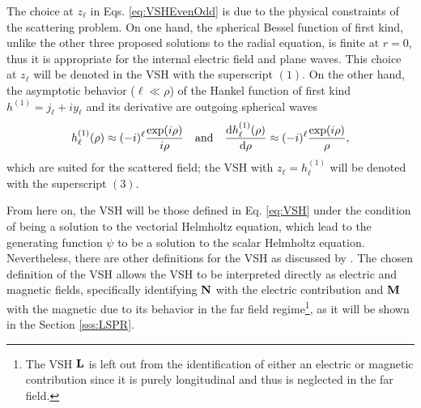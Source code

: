 \noindent%
The choice at $z_\ell$ in Eqs. \eqref{eq:VSHEvenOdd} is due to the physical constraints of the scattering problem. On one hand, the spherical Bessel function of first kind, unlike the other three proposed solutions to the radial equation, is finite at $r = 0$, thus it is appropriate for the internal electric field and plane waves. This choice at $z_\ell$ will be denoted in the VSH with the superscript $(1)$. On the other hand, the asymptotic behavior ($\ell\ll \rho$) of the Hankel function of first kind $h^{(1)} = j_\ell + i y_\ell$ and its derivative are outgoing spherical waves \cite{bohren_absorption_1983}
%
%
%
%
%
\begin{align}
	h_\ell^{(1)}(\rho)\approx (-i)^\ell \frac{\exp(i\rho)}{i\rho}
		\qqtext{and}
	\dv{h_\ell^{(1)}(\rho)}{\rho} \approx (-i)^\ell \frac{\exp(i\rho)}{\rho},
\end{align}
which are suited for the scattered field; the VSH with $z_\ell = h^{(1)}_\ell$ will be denoted with the superscript $(3)$.

From here on, the VSH will be those defined in Eq. \eqref{eq:VSH} under the condition of being a solution to the vectorial Helmholtz equation, which lead to the generating function $\psi$ to be a solution to the scalar Helmholtz equation. Nevertheless, there are other definitions for the VSH as discussed by \citeauthor{barrera_vector_1985} \cite{barrera_vector_1985}. The chosen definition of the VSH allows the VSH to be interpreted directly as electric and magnetic fields, specifically identifying $\vb{N}$ with the electric contribution and $\vb{M}$ with the magnetic due to its behavior in the far field regime\footnote{The VSH $\vb{L}$ is left out from the identification of either an electric or magnetic contribution since it is purely longitudinal and thus is neglected in the far field.}, as it will be shown in the Section \ref{sss:LSPR}.
